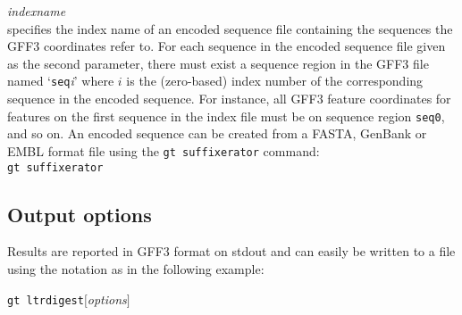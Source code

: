 \documentclass[12pt,titlepage]{article}
\newcommand{\GtLTRdigest}{\texttt{gt ltrdigest}\xspace}
\newcommand{\Gtsuffixerator}{\texttt{gt suffixerator}\xspace}
\begin{document}
\emph{indexname}\\ specifies the index name of an encoded sequence file containing the sequences the GFF3 coordinates refer to. For each sequence in the encoded sequence file given as the second parameter, there must exist a sequence region in the GFF3 file named `\texttt{seq}\textit{i}' where $i$ is the (zero-based) index number of the corresponding sequence in the encoded sequence. For instance, all GFF3 feature coordinates for features on the first sequence in the index file must be on sequence region \texttt{seq0}, and so on. An encoded sequence can be created from a FASTA, GenBank or EMBL format file using the \Gtsuffixerator command:\\
\Gtsuffixerator {}       

\subsection{Output options}

Results are reported in GFF3 format on stdout and can easily
be written to a file using the notation \texttt{}
 as in the following example:

\GtLTRdigest $[$\emph{options}$]$   \texttt{} 
\end{document}

